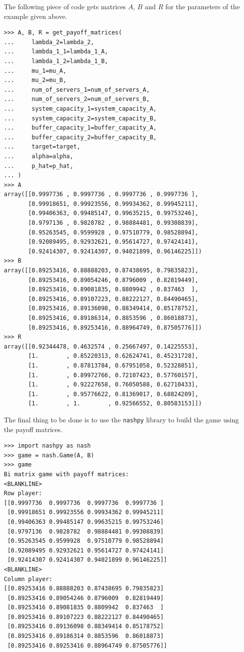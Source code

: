 The following piece of code gets matrices \(A\), \(B\) and \(R\) for the
parameters of the example given above.

\begin{lstlisting}[style=pystyle]
>>> A, B, R = get_payoff_matrices(
...     lambda_2=lambda_2,
...     lambda_1_1=lambda_1_A,
...     lambda_1_2=lambda_1_B,
...     mu_1=mu_A,
...     mu_2=mu_B,
...     num_of_servers_1=num_of_servers_A,
...     num_of_servers_2=num_of_servers_B,
...     system_capacity_1=system_capacity_A,
...     system_capacity_2=system_capacity_B,
...     buffer_capacity_1=buffer_capacity_A,
...     buffer_capacity_2=buffer_capacity_B,
...     target=target,
...     alpha=alpha,
...     p_hat=p_hat,
... )
>>> A
array([[0.9997736 , 0.9997736 , 0.9997736 , 0.9997736 ],
       [0.99918651, 0.99923556, 0.99934362, 0.99945211],
       [0.99406363, 0.99485147, 0.99635215, 0.99753246],
       [0.9797136 , 0.9828782 , 0.98884481, 0.99308839],
       [0.95263545, 0.9599928 , 0.97510779, 0.98528894],
       [0.92089495, 0.92932621, 0.95614727, 0.97424141],
       [0.92414307, 0.92414307, 0.94021899, 0.96146225]])
>>> B
array([[0.89253416, 0.88888203, 0.87438695, 0.79835823],
       [0.89253416, 0.89054246, 0.8796009 , 0.82819449],
       [0.89253416, 0.89081835, 0.8809942 , 0.837463  ],
       [0.89253416, 0.89107223, 0.88222127, 0.84490465],
       [0.89253416, 0.89136098, 0.88349414, 0.85178752],
       [0.89253416, 0.89186314, 0.8853596 , 0.86018873],
       [0.89253416, 0.89253416, 0.88964749, 0.87505776]])
>>> R
array([[0.92344478, 0.4632574 , 0.25667497, 0.14225553],
       [1.        , 0.85220313, 0.62624741, 0.45231728],
       [1.        , 0.87813784, 0.67951058, 0.52328851],
       [1.        , 0.89972766, 0.72107423, 0.57760157],
       [1.        , 0.92227658, 0.76050588, 0.62710433],
       [1.        , 0.95776622, 0.81369017, 0.68824209],
       [1.        , 1.        , 0.92566552, 0.80583153]])

\end{lstlisting}

The final thing to be done is to use the \lstinline[style=pystyle]{nashpy}
library to build the game using the payoff matrices.

\begin{lstlisting}[style=pystyle]
>>> import nashpy as nash
>>> game = nash.Game(A, B)
>>> game
Bi matrix game with payoff matrices:
<BLANKLINE>
Row player:
[[0.9997736  0.9997736  0.9997736  0.9997736 ]
 [0.99918651 0.99923556 0.99934362 0.99945211]
 [0.99406363 0.99485147 0.99635215 0.99753246]
 [0.9797136  0.9828782  0.98884481 0.99308839]
 [0.95263545 0.9599928  0.97510779 0.98528894]
 [0.92089495 0.92932621 0.95614727 0.97424141]
 [0.92414307 0.92414307 0.94021899 0.96146225]]
<BLANKLINE>
Column player:
[[0.89253416 0.88888203 0.87438695 0.79835823]
 [0.89253416 0.89054246 0.8796009  0.82819449]
 [0.89253416 0.89081835 0.8809942  0.837463  ]
 [0.89253416 0.89107223 0.88222127 0.84490465]
 [0.89253416 0.89136098 0.88349414 0.85178752]
 [0.89253416 0.89186314 0.8853596  0.86018873]
 [0.89253416 0.89253416 0.88964749 0.87505776]]

\end{lstlisting}



